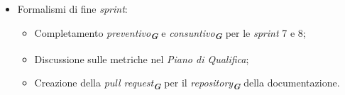 \begin{itemize}
    \item Formalismi di fine \emph{sprint}:
    \begin{itemize}
        \item Completamento \emph{preventivo}\textsubscript{\textit{\textbf{G}}} e \emph{consuntivo}\textsubscript{\textit{\textbf{G}}} per le \emph{sprint} 7 e 8;
        \item Discussione sulle metriche nel \emph{Piano di Qualifica};
        \item Creazione della \emph{pull request}\textsubscript{\textit{\textbf{G}}} per il \emph{repository}\textsubscript{\textit{\textbf{G}}} della documentazione.
    \end{itemize}
\end{itemize}